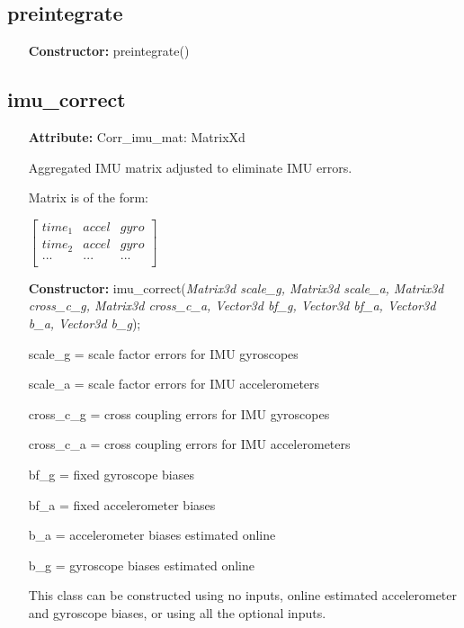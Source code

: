\documentclass[11pt,a4paper]{article}
\begin{document}
	\subsection{preintegrate}

	\begin{itemize}
		\item[\textbf{Constructor:}] preintegrate()
	\end{itemize}
	
	\subsection{imu\_correct}
	
	\begin{itemize}
		\item[\textbf{Attribute:}] Corr\_imu\_mat:  MatrixXd
		
		Aggregated IMU matrix adjusted to eliminate IMU errors.
		
		Matrix is of the form:
		
		$\left[\begin{array}{ccc}
					time_1 & accel & gyro \\
					time_2 & accel & gyro \\
					...    & ...   & ...  \\	
		\end{array}\right]$
		
		\item[\textbf{Constructor:}] imu\_correct(\textit{Matrix3d scale\_g, Matrix3d scale\_a, Matrix3d cross\_c\_g, Matrix3d cross\_c\_a, Vector3d bf\_g, Vector3d bf\_a, Vector3d b\_a, Vector3d b\_g});
		
		scale\_g = scale factor errors for IMU gyroscopes

        scale\_a = scale factor errors for IMU accelerometers

        cross\_c\_g = cross coupling errors for IMU gyroscopes

        cross\_c\_a = cross coupling errors for IMU accelerometers

        bf\_g = fixed gyroscope biases

        bf\_a = fixed accelerometer biases

        b\_a = accelerometer biases estimated online

        b\_g = gyroscope biases estimated online
        
        This class can be constructed using no inputs, online estimated accelerometer and gyroscope biases, or using all the optional inputs.


\end{itemize}
\end{document}
